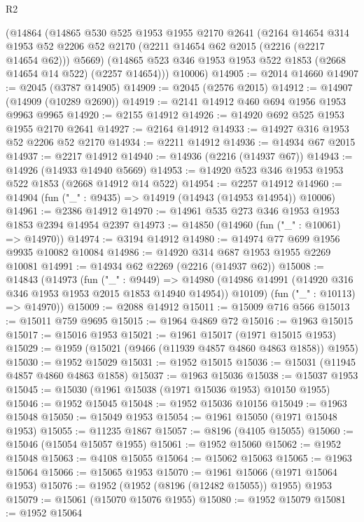 \begin{lexlean}{R2}
\begin{coremodule}
    (@14864
      (@14865
        @530
        @525
        @1953
        @1955
        @2170
        @2641
        (@2164
          @14654
          @314
          @1953
          @52
          @2206
          @52
          @2170
          (@2211 @14654 @62 @2015 (@2216 (@2217 @14654 @62)))
          @5669)
        (@14865 @523 @346 @1953 @1953 @522 @1853 (@2668 @14654 @14 @522) (@2257 @14654)))
      @10006)
@14905 := @2014 @14660
@14907 := @2045 (@3787 @14905)
@14909 := @2045 (@2576 @2015)
@14912 := @14907 (@14909 (@10289 @2690))
@14919 := @2141 @14912 @460 @694 @1956 @1953 @9963 @9965
@14920 := @2155 @14912
@14926 := @14920 @692 @525 @1953 @1955 @2170 @2641
@14927 := @2164 @14912
@14933 := @14927 @316 @1953 @52 @2206 @52 @2170
@14934 := @2211 @14912
@14936 := @14934 @67 @2015
@14937 := @2217 @14912
@14940 := @14936 (@2216 (@14937 @67))
@14943 := @14926 (@14933 @14940 @5669)
@14953 := @14920 @523 @346 @1953 @1953 @522 @1853 (@2668 @14912 @14 @522)
@14954 := @2257 @14912
@14960 := @14904 (fun ("_" : @9435) => @14919 (@14943 (@14953 @14954)) @10006)
@14961 := @2386 @14912
@14970 := @14961 @535 @273 @346 @1953 @1953 @1853 @2394 @14954 @2397
@14973 := @14850 (@14960 (fun ("_" : @10061) => @14970))
@14974 := @3194 @14912
@14980 := @14974 @77 @699 @1956 @9935 @10082 @10084
@14986 := @14920 @314 @687 @1953 @1955 @2269 @10081
@14991 := @14934 @62 @2269 (@2216 (@14937 @62))
@15008 := @14843
    (@14973
      (fun ("_" : @9449) =>
      @14980 (@14986 @14991 (@14920 @316 @346 @1953 @1953 @2015 @1853 @14940 @14954)) @10109)
      (fun ("_" : @10113) => @14970))
@15009 := @2088 @14912
@15011 := @15009 @716 @566
@15013 := @15011 @759 @9695
@15015 := @1964 @4869 @72
@15016 := @1963 @15015
@15017 := @15016 @1953
@15021 := @1961 @15017 (@1971 @15015 @1953)
@15029 := @1959 (@15021 (@9466 (@11939 @4857 @4860 @4863 @1858)) @1955)
@15030 := @1952 @15029
@15031 := @1952 @15015
@15036 := @15031 (@11945 @4857 @4860 @4863 @1858)
@15037 := @1963 @15036
@15038 := @15037 @1953
@15045 := @15030 (@1961 @15038 (@1971 @15036 @1953) @10150 @1955)
@15046 := @1952 @15045
@15048 := @1952 @15036 @10156
@15049 := @1963 @15048
@15050 := @15049 @1953
@15054 := @1961 @15050 (@1971 @15048 @1953)
@15055 := @11235 @1867
@15057 := @8196 (@4105 @15055)
@15060 := @15046 (@15054 @15057 @1955)
@15061 := @1952 @15060
@15062 := @1952 @15048
@15063 := @4108 @15055
@15064 := @15062 @15063
@15065 := @1963 @15064
@15066 := @15065 @1953
@15070 := @1961 @15066 (@1971 @15064 @1953)
@15076 := @1952 (@1952 (@8196 (@12482 @15055)) @1955) @1953
@15079 := @15061 (@15070 @15076 @1955)
@15080 := @1952 @15079
@15081 := @1952 @15064

\end{coremodule}
\end{lexlean}
